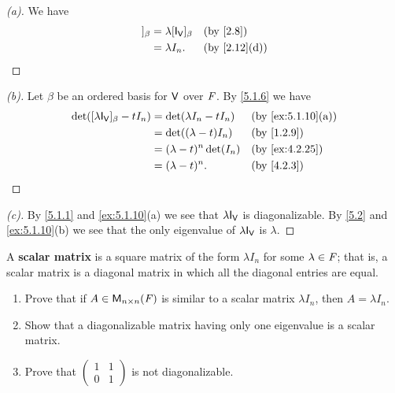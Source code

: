 \begin{proof}[(a)]
	We have
	\begin{align*}
		[\lambda \IT[\V]]_{\beta} & = \lambda [\IT[\V]]_{\beta} &  & \by{2.8}     \\
		                          & = \lambda I_n.              &  & \by{2.12}[d]
	\end{align*}
\end{proof}

\begin{proof}[(b)]
	Let \(\beta\) be an ordered basis for \(\mathsf{V}\) over \(\mathit{F}\).
	By \cref{5.1.6} we have
	\begin{align*}
		\det([\lambda \IT[\V]]_{\beta} - t I_n) & = \det(\lambda I_n - t I_n) &  & \by{ex:5.1.10}[a] \\
		                                        & = \det((\lambda - t) I_n)   &  & \by{1.2.9}        \\
		                                        & = (\lambda - t)^n \det(I_n) &  & \by{ex:4.2.25}    \\
		                                        & = (\lambda - t)^n.          &  & \by{4.2.3}
	\end{align*}
\end{proof}

\begin{proof}[(c)]
	By \cref{5.1.1} and \cref{ex:5.1.10}(a) we see that \(\lambda \IT[\V]\) is diagonalizable.
	By \cref{5.2} and \cref{ex:5.1.10}(b) we see that the only eigenvalue of \(\lambda \IT[\V]\) is \(\lambda\).
\end{proof}

\begin{ex}\label{ex:5.1.11}
	A \textbf{scalar matrix} is a square matrix of the form \(\lambda I_n\) for some \(\lambda \in \mathit{F}\);
	that is, a scalar matrix is a diagonal matrix in which all the diagonal entries are equal.
	\begin{enumerate}
		\item Prove that if \(A \in \ms[n][n][\F]\) is similar to a scalar matrix \(\lambda I_n\), then \(A = \lambda I_n\).
		\item Show that a diagonalizable matrix having only one eigenvalue is a scalar matrix.
		\item Prove that \(\begin{pmatrix}
			      1 & 1 \\
			      0 & 1
		      \end{pmatrix}\) is not diagonalizable.
	\end{enumerate}
\end{ex}

